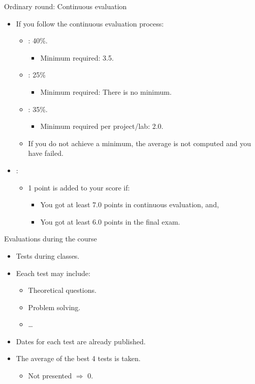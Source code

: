 \begin{frame}[t]{Ordinary round: Continuous evaluation}
\begin{itemize}
  \item If you follow the continuous evaluation process:
    \begin{itemize}
    \item {}: 40\%.
      \begin{itemize}
        \item Minimum required: 3.5.
      \end{itemize}
    \item {}: 25\%
      \begin{itemize}
        \item Minimum required: There is no minimum.
      \end{itemize}
    \item {}: 35\%.
      \begin{itemize}
        \item Minimum required per project/lab: 2.0.
      \end{itemize}
    \item If you do not achieve a minimum, the average is not computed and \alert{you have failed}.
  \end{itemize}
  \item {}:
    \begin{itemize}
      \item 1 point is added to your score if:
        \begin{itemize}
          \item You got at least 7.0 points in continuous evaluation, and,
          \item You got at least 6.0 points in the final exam.
        \end{itemize}
    \end{itemize}
\end{itemize}
\end{frame}

\begin{frame}[t]{Evaluations during the course}
\begin{itemize}
  \item Tests during classes.
  \pause\vfill
  \item Eeach test may include:
    \begin{itemize}
      \item Theoretical questions.
      \item Problem solving.
      \item \ldots
    \end{itemize}
  \pause\vfill
  \item Dates for each test are already published.
  \pause\vfill
  \item The average of the best 4 tests is taken.
    \begin{itemize}
      \item Not presented $\Rightarrow$ 0.
    \end{itemize}
\end{itemize}
\end{frame}

